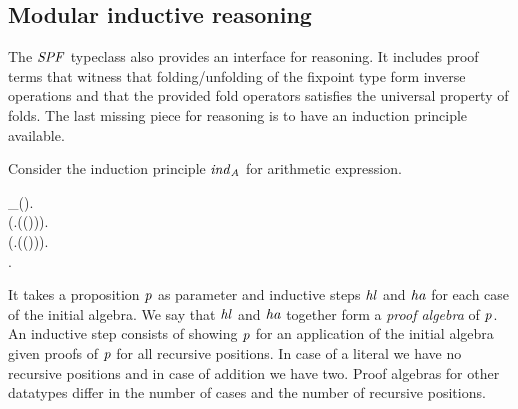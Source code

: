 \subsection{Modular inductive reasoning}
\label{ssec:modularinductivereasoning}

The \ensuremath{\Conid{SPF}} typeclass also provides an interface for reasoning. It
includes proof terms that witness that folding/unfolding of the
fixpoint type form inverse operations and that the provided fold
operators satisfies the universal property of folds. The last missing
piece for reasoning is to have an induction principle available.


Consider the induction principle \ensuremath{\Varid{ind}_{\Conid{A}}} for arithmetic expression.
\begin{hscode}\SaveRestoreHook
{}%
%
%
%
%
%
%
\>[3]{}_{}\mathbin{::}{}\<[16]%
\>[16]{}\forall {}\<[28]%
\>[28]{}\mathbin{::}(\to {})\hsforall .{}\<[E]%
\\
\>[16]{}\forall {}\<[28]%
\>[28]{}\mathbin{::}(\forall {}\hsforall .{}\<[60]%
\>[60]{}\;(\;(\;)))\hsforall .{}\<[E]%
\\
\>[16]{}\forall {}\<[28]%
\>[28]{}\mathbin{::}(\forall {}\hsforall \;.{}\<[45]%
\>[45]{}\;\to {}\;\to {}\<[60]%
\>[60]{}\;(\;(\;\;)))\hsforall .{}\<[E]%
\\
\>[16]{}\forall {}\hsforall .\;\<[E]%
\ColumnHook
\end{hscode}\resethooks

It takes a proposition \ensuremath{\Varid{p}} as parameter and inductive steps \ensuremath{\Varid{hl}} and
\ensuremath{\Varid{ha}} for each case of the initial algebra. We say that \ensuremath{\Varid{hl}} and \ensuremath{\Varid{ha}}
together form a \emph{proof algebra} of \ensuremath{\Varid{p}}. An inductive step
consists of showing \ensuremath{\Varid{p}} for an application of the initial algebra
given proofs of \ensuremath{\Varid{p}} for all recursive positions. In case of a literal
we have no recursive positions and in case of addition we have two.
Proof algebras for other datatypes differ in the number of cases and
the number of recursive positions.

